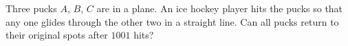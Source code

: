 Three pucks $A$, $B$, $C$ are in a plane. An ice hockey player hits the pucks so that any one glides through the other two in a straight line. Can all pucks return to their original spots after $1001$ hits?
